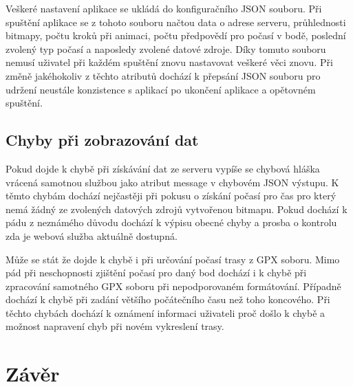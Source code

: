 \documentclass[czech,bachelor,dept460,male,csharp,cpdeclaration]{diploma}
\begin{document}
	Veškeré nastavení aplikace se ukládá do konfiguračního JSON souboru. Při spuštění aplikace se z tohoto souboru načtou data o adrese serveru, průhlednosti bitmapy, počtu kroků při animaci, počtu předpovědí pro počasí v bodě, poslední zvolený typ počasí a naposledy zvolené datové zdroje. Díky tomuto souboru nemusí uživatel při každém spuštění znovu nastavovat veškeré věci znovu. Při změně jakéhokoliv z těchto atributů dochází k přepsání JSON souboru pro udržení neustále konzistence s aplikací po ukončení aplikace a opětovném spuštění.
	
	\section{Chyby při zobrazování dat}
	
	Pokud dojde k chybě při získávání dat ze serveru vypíše se chybová hláška vrácená samotnou službou jako atribut message v chybovém JSON výstupu. K těmto chybám dochází nejčastěji při pokusu o získání počasí pro čas pro který nemá žádný ze zvolených datových zdrojů vytvořenou bitmapu. Pokud dochází k pádu z neznámého důvodu dochází k výpisu obecné chyby a prosba o kontrolu zda je webová služba aktuálně dostupná.
	
	Může se stát že dojde k chybě i při určování počasí trasy z GPX soboru. Mimo pád při neschopnosti zjištění počasí pro daný bod dochází i k chybě při zpracování samotného GPX soboru při nepodporovaném formátování. Případně dochází k chybě při zadání většího počátečního času než toho koncového. Při těchto chybách dochází k oznámení informaci uživateli proč došlo k chybě a možnost napravení chyb při novém vykreslení trasy.
	
	\chapter{Závěr}
	
	\printbibliography[title={Literatura}, heading=bibintoc]
	
	
\end{document}
